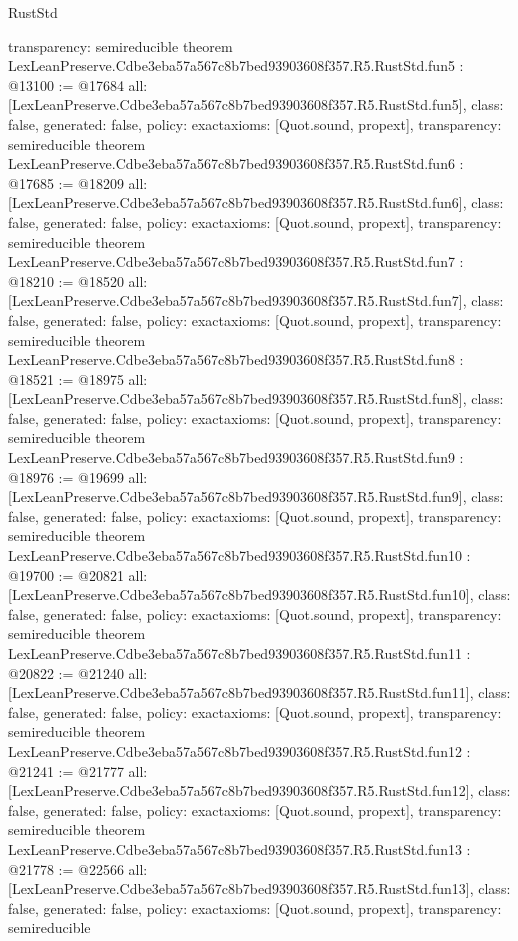 \begin{lexlean}{RustStd}
\begin{coremodule}
{  transparency: semireducible
}
theorem LexLeanPreserve.Cdbe3eba57a567c8b7bed93903608f357.R5.RustStd.fun5 : @13100 := @17684 {
  all: [LexLeanPreserve.Cdbe3eba57a567c8b7bed93903608f357.R5.RustStd.fun5],
  class: false,
  generated: false,
  policy: exact{axioms: [Quot.sound, propext]},
  transparency: semireducible
}
theorem LexLeanPreserve.Cdbe3eba57a567c8b7bed93903608f357.R5.RustStd.fun6 : @17685 := @18209 {
  all: [LexLeanPreserve.Cdbe3eba57a567c8b7bed93903608f357.R5.RustStd.fun6],
  class: false,
  generated: false,
  policy: exact{axioms: [Quot.sound, propext]},
  transparency: semireducible
}
theorem LexLeanPreserve.Cdbe3eba57a567c8b7bed93903608f357.R5.RustStd.fun7 : @18210 := @18520 {
  all: [LexLeanPreserve.Cdbe3eba57a567c8b7bed93903608f357.R5.RustStd.fun7],
  class: false,
  generated: false,
  policy: exact{axioms: [Quot.sound, propext]},
  transparency: semireducible
}
theorem LexLeanPreserve.Cdbe3eba57a567c8b7bed93903608f357.R5.RustStd.fun8 : @18521 := @18975 {
  all: [LexLeanPreserve.Cdbe3eba57a567c8b7bed93903608f357.R5.RustStd.fun8],
  class: false,
  generated: false,
  policy: exact{axioms: [Quot.sound, propext]},
  transparency: semireducible
}
theorem LexLeanPreserve.Cdbe3eba57a567c8b7bed93903608f357.R5.RustStd.fun9 : @18976 := @19699 {
  all: [LexLeanPreserve.Cdbe3eba57a567c8b7bed93903608f357.R5.RustStd.fun9],
  class: false,
  generated: false,
  policy: exact{axioms: [Quot.sound, propext]},
  transparency: semireducible
}
theorem LexLeanPreserve.Cdbe3eba57a567c8b7bed93903608f357.R5.RustStd.fun10 : @19700 := @20821 {
  all: [LexLeanPreserve.Cdbe3eba57a567c8b7bed93903608f357.R5.RustStd.fun10],
  class: false,
  generated: false,
  policy: exact{axioms: [Quot.sound, propext]},
  transparency: semireducible
}
theorem LexLeanPreserve.Cdbe3eba57a567c8b7bed93903608f357.R5.RustStd.fun11 : @20822 := @21240 {
  all: [LexLeanPreserve.Cdbe3eba57a567c8b7bed93903608f357.R5.RustStd.fun11],
  class: false,
  generated: false,
  policy: exact{axioms: [Quot.sound, propext]},
  transparency: semireducible
}
theorem LexLeanPreserve.Cdbe3eba57a567c8b7bed93903608f357.R5.RustStd.fun12 : @21241 := @21777 {
  all: [LexLeanPreserve.Cdbe3eba57a567c8b7bed93903608f357.R5.RustStd.fun12],
  class: false,
  generated: false,
  policy: exact{axioms: [Quot.sound, propext]},
  transparency: semireducible
}
theorem LexLeanPreserve.Cdbe3eba57a567c8b7bed93903608f357.R5.RustStd.fun13 : @21778 := @22566 {
  all: [LexLeanPreserve.Cdbe3eba57a567c8b7bed93903608f357.R5.RustStd.fun13],
  class: false,
  generated: false,
  policy: exact{axioms: [Quot.sound, propext]},
  transparency: semireducible
}
\end{coremodule}
\end{lexlean}
